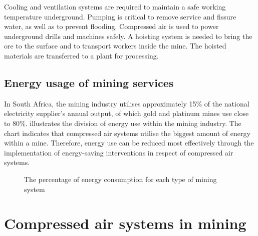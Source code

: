 	 Cooling and ventilation systems are required to maintain a safe working temperature underground. Pumping is critical to remove service and fissure water, as well as to prevent flooding. Compressed air is used to power underground drills and machines safely. A hoisting system is needed to bring the ore to the surface and to transport workers inside the mine. The hoisted materials are transferred to a plant for processing.  
		
		\subsection{Energy usage of mining services}
		
			In South Africa, the mining industry utilises approximately 15\% of the national electricity supplier's annual output, of which gold and platinum mines use  close to 80\%\footnotemark[1].  illustrates the division of energy use within the mining industry. The chart indicates that compressed air systems utilise the biggest amount of energy within a mine. Therefore, energy use can be reduced most effectively through the implementation of energy-saving interventions in respect of compressed air systems.
			\begin{figure}[h]
				\centering
				\fbox{}
				\caption[The percentage of energy consumption for each type of mining system]{The percentage of energy consumption for each type of mining system \cite{le2005energy}}
				\label{fig: Energy Split}
			\end{figure}
\section{Compressed air systems in mining}
